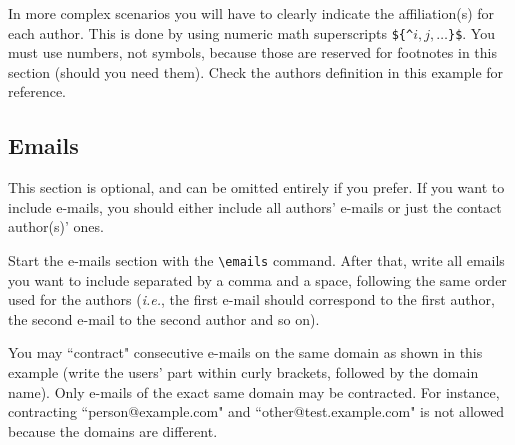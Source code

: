 \documentclass{article}
\begin{document}
In more complex scenarios you will have to clearly indicate the affiliation(s) for each author. This is done by using numeric math superscripts {\tt \$\{\^{}$i,j, \ldots$\}\$}. You must use numbers, not symbols, because those are reserved for footnotes in this section (should you need them). Check the authors definition in this example for reference.

\subsection{Emails}

This section is optional, and can be omitted entirely if you prefer. If you want to include e-mails, you should either include all authors' e-mails or just the contact author(s)' ones.

Start the e-mails section with the {\tt \textbackslash{}emails} command. After that, write all emails you want to include separated by a comma and a space, following the same order used for the authors (\emph{i.e.}, the first e-mail should correspond to the first author, the second e-mail to the second author and so on).

You may ``contract" consecutive e-mails on the same domain as shown in this example (write the users' part within curly brackets, followed by the domain name). Only e-mails of the exact same domain may be contracted. For instance, contracting ``person@example.com" and ``other@test.example.com" is not allowed because the domains are different.



\end{document}
